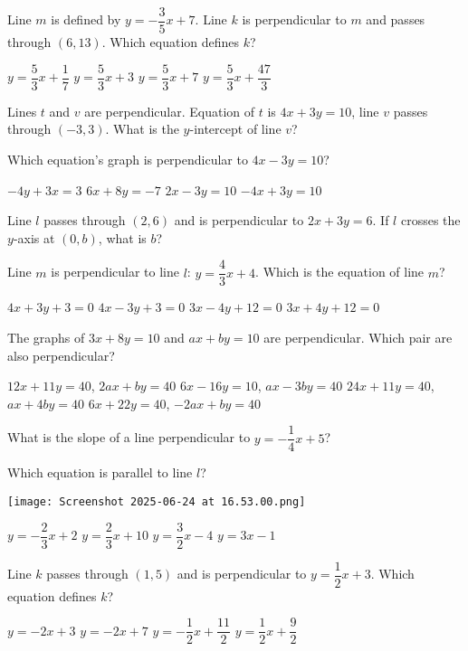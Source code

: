\documentclass[12pt]{exam}
\begin{document}
\begin{questions}
\question Line $m$ is defined by $y = -\dfrac{3}{5}x + 7$. Line $k$ is perpendicular to $m$ and passes through $(6,13)$. Which equation defines $k$?
\begin{choices}
\choice $y = \dfrac{5}{3}x + \dfrac{1}{7}$
\choice $y = \dfrac{5}{3}x + 3$
\choice $y = \dfrac{5}{3}x + 7$
\choice $y = \dfrac{5}{3}x + \dfrac{47}{3}$
\end{choices}

\question Lines $t$ and $v$ are perpendicular. Equation of $t$ is $4x + 3y = 10$, line $v$ passes through $(-3,3)$. What is the $y$-intercept of line $v$?

\question Which equation's graph is perpendicular to $4x - 3y = 10$?
\begin{choices}
\choice $-4y + 3x = 3$
\choice $6x + 8y = -7$
\choice $2x - 3y = 10$
\choice $-4x + 3y = 10$
\end{choices}

\question Line $l$ passes through $(2,6)$ and is perpendicular to $2x + 3y = 6$. If $l$ crosses the $y$-axis at $(0,b)$, what is $b$?

\question Line $m$ is perpendicular to line $l$: $y = \dfrac{4}{3}x + 4$. Which is the equation of line $m$?
\begin{choices}
\choice $4x + 3y + 3 = 0$
\choice $4x - 3y + 3 = 0$
\choice $3x - 4y + 12 = 0$
\choice $3x + 4y + 12 = 0$
\end{choices}

\question The graphs of $3x + 8y = 10$ and $ax + by = 10$ are perpendicular. Which pair are also perpendicular?
\begin{choices}
\choice $12x + 11y = 40$, $2ax + by = 40$
\choice $6x - 16y = 10$, $ax - 3by = 40$
\choice $24x + 11y = 40$, $ax + 4by = 40$
\choice $6x + 22y = 40$, $-2ax + by = 40$
\end{choices}

\question What is the slope of a line perpendicular to $y = -\dfrac{1}{4}x + 5$?

\question Which equation is parallel to line $l$?
\begin{center}
\texttt{[image: Screenshot 2025-06-24 at 16.53.00.png]}
\end{center}
\begin{choices}
\choice $y = -\dfrac{2}{3}x + 2$
\choice $y = \dfrac{2}{3}x + 10$
\choice $y = \dfrac{3}{2}x - 4$
\choice $y = 3x - 1$
\end{choices}

\question Line $k$ passes through $(1,5)$ and is perpendicular to $y = \dfrac{1}{2}x + 3$. Which equation defines $k$?
\begin{choices}
\choice $y = -2x + 3$
\choice $y = -2x + 7$
\choice $y = -\dfrac{1}{2}x + \dfrac{11}{2}$
\choice $y = \dfrac{1}{2}x + \dfrac{9}{2}$
\end{choices}


\end{questions}
\end{document}
